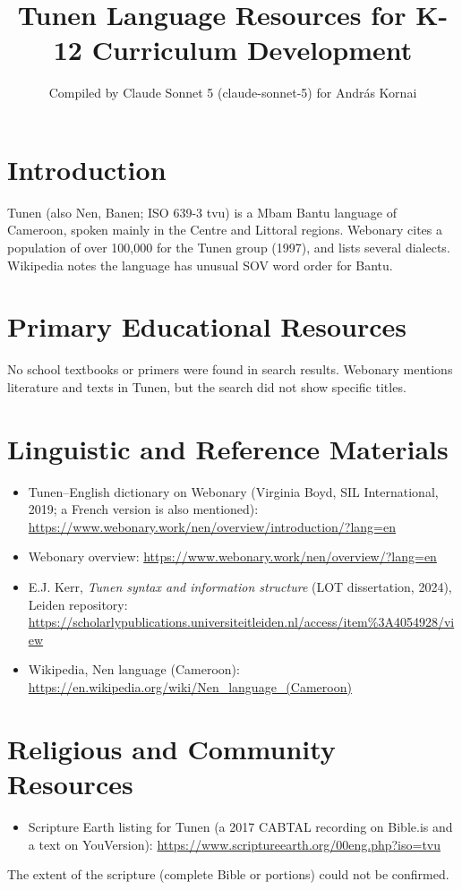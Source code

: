 \documentclass[12pt]{article}
\title{Tunen Language Resources for K-12 Curriculum Development}
\author{Compiled by Claude Sonnet 5 (claude-sonnet-5) for Andr\'as Kornai}
\date{}
\begin{document}
\maketitle

\section{Introduction}
Tunen (also Nen, Banen; ISO 639-3 tvu) is a Mbam Bantu language of Cameroon, spoken mainly in the Centre and Littoral regions. Webonary cites a population of over 100,000 for the Tunen group (1997), and lists several dialects. Wikipedia notes the language has unusual SOV word order for Bantu.

\section{Primary Educational Resources}
No school textbooks or primers were found in search results. Webonary mentions literature and texts in Tunen, but the search did not show specific titles.

\section{Linguistic and Reference Materials}
\begin{itemize}
\item Tunen--English dictionary on Webonary (Virginia Boyd, SIL International, 2019; a French version is also mentioned): \url{https://www.webonary.work/nen/overview/introduction/?lang=en}
\item Webonary overview: \url{https://www.webonary.work/nen/overview/?lang=en}
\item E.J. Kerr, \emph{Tunen syntax and information structure} (LOT dissertation, 2024), Leiden repository: \url{https://scholarlypublications.universiteitleiden.nl/access/item%3A4054928/view}
\item Wikipedia, Nen language (Cameroon): \url{https://en.wikipedia.org/wiki/Nen_language_(Cameroon)}
\end{itemize}

\section{Religious and Community Resources}
\begin{itemize}
\item Scripture Earth listing for Tunen (a 2017 CABTAL recording on Bible.is and a text on YouVersion): \url{https://www.scriptureearth.org/00eng.php?iso=tvu}
\end{itemize}
The extent of the scripture (complete Bible or portions) could not be confirmed.
\end{document}
